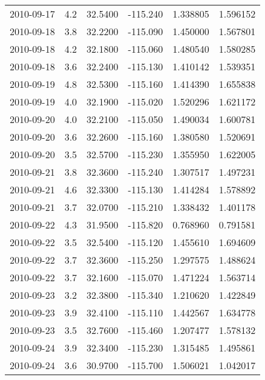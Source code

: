 \begin{tabular}{lrrrrr}
2010-09-17 &       4.2 &  32.5400 &  -115.240 &         1.338805 &         1.596152 \\
2010-09-18 &       3.8 &  32.2200 &  -115.090 &         1.450000 &         1.567801 \\
2010-09-18 &       4.2 &  32.1800 &  -115.060 &         1.480540 &         1.580285 \\
2010-09-18 &       3.6 &  32.2400 &  -115.130 &         1.410142 &         1.539351 \\
2010-09-19 &       4.8 &  32.5300 &  -115.160 &         1.414390 &         1.655838 \\
2010-09-19 &       4.0 &  32.1900 &  -115.020 &         1.520296 &         1.621172 \\
2010-09-20 &       4.0 &  32.2100 &  -115.050 &         1.490034 &         1.600781 \\
2010-09-20 &       3.6 &  32.2600 &  -115.160 &         1.380580 &         1.520691 \\
2010-09-20 &       3.5 &  32.5700 &  -115.230 &         1.355950 &         1.622005 \\
2010-09-21 &       3.8 &  32.3600 &  -115.240 &         1.307517 &         1.497231 \\
2010-09-21 &       4.6 &  32.3300 &  -115.130 &         1.414284 &         1.578892 \\
2010-09-21 &       3.7 &  32.0700 &  -115.210 &         1.338432 &         1.401178 \\
2010-09-22 &       4.3 &  31.9500 &  -115.820 &         0.768960 &         0.791581 \\
2010-09-22 &       3.5 &  32.5400 &  -115.120 &         1.455610 &         1.694609 \\
2010-09-22 &       3.7 &  32.3600 &  -115.250 &         1.297575 &         1.488624 \\
2010-09-22 &       3.7 &  32.1600 &  -115.070 &         1.471224 &         1.563714 \\
2010-09-23 &       3.2 &  32.3800 &  -115.340 &         1.210620 &         1.422849 \\
2010-09-23 &       3.9 &  32.4100 &  -115.110 &         1.442567 &         1.634778 \\
2010-09-23 &       3.5 &  32.7600 &  -115.460 &         1.207477 &         1.578132 \\
2010-09-24 &       3.9 &  32.3400 &  -115.230 &         1.315485 &         1.495861 \\
2010-09-24 &       3.6 &  30.9700 &  -115.700 &         1.506021 &         1.042017 \\

\end{tabular}
